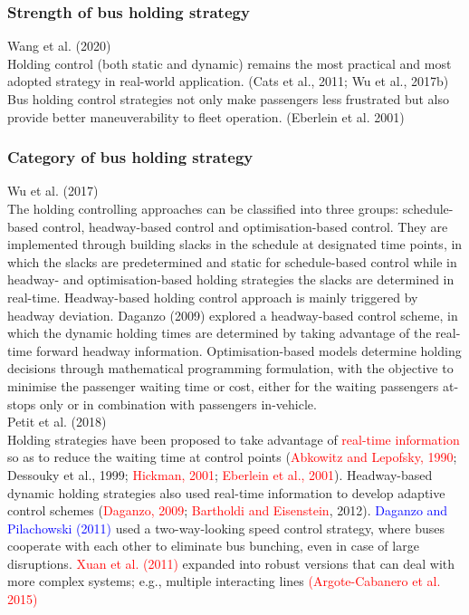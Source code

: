 \documentclass{article}
\begin{document}
\subsubsection*{Strength of bus holding strategy}
\noindent \textrm{Wang et al. (2020)}\\
Holding control (both static and dynamic) remains the most practical 
and most adopted strategy in real-world application. 
\textrm{(Cats et al., 2011; Wu et al., 2017b)}\\
Bus holding control strategies not only make passengers less frustrated 
but also provide better maneuverability to fleet operation.
\textrm{(Eberlein et al. 2001)}

\subsubsection*{Category of bus holding strategy}
\noindent \textrm{Wu et al. (2017)}\\
The holding controlling approaches can be classified into three groups: 
schedule-based control, headway-based control and optimisation-based control.
They are implemented through building slacks in the schedule at designated time points, 
in which the slacks are predetermined and static for schedule-based control 
while in headway- and optimisation-based holding strategies 
the slacks are determined in real-time.
Headway-based holding control approach is mainly triggered by headway deviation.
\textrm{Daganzo (2009)} explored a headway-based control scheme, 
in which the dynamic holding times are determined 
by taking advantage of the real-time forward headway information.
Optimisation-based models determine holding decisions through mathematical programming formulation,
with the objective to minimise the passenger waiting time or cost, 
either for the waiting passengers at-stops only or in combination with passengers in-vehicle.\\

\noindent \textrm{Petit et al. (2018)}\\
Holding strategies have been proposed to take advantage of \textcolor{red}{real-time information} \marginpar[]{\textcolor{red}{What is the real-time information for scheudle-based holding?}}
so as to reduce the waiting time at control points
\textrm{(\textcolor{red}{Abkowitz and Lepofsky, 1990}; Dessouky et al., 1999; \textcolor{red}{Hickman, 2001}; \textcolor{red}{Eberlein et al., 2001})}.
Headway-based dynamic holding strategies also used real-time information to develop adaptive control schemes 
\textrm{(\textcolor{red}{Daganzo, 2009}; \textcolor{red}{Bartholdi and Eisenstein}, 2012)}.
\textrm{\textcolor{blue}{Daganzo and Pilachowski (2011)}} used a two-way-looking speed control strategy, 
where buses cooperate with each other to eliminate bus bunching, 
even in case of large disruptions.
\textrm{\textcolor{red}{Xuan et al. (2011)}} expanded into robust versions 
that can deal with more complex systems; 
e.g., multiple interacting lines \textrm{\textcolor{red}{(Argote-Cabanero et al. 2015)}}\\
\end{document}
